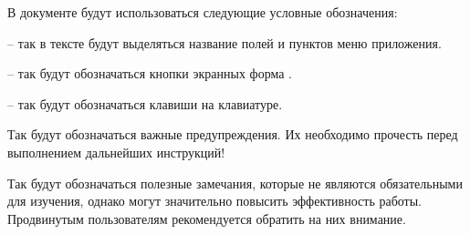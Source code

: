  В документе будут использоваться следующие условные обозначения:  \vspace*{0.5em}
 
  -- так в тексте будут выделяться название полей и пунктов меню приложения.
 
  -- так будут обозначаться кнопки экранных форма \tmis.
 
  -- так будут обозначаться клавиши на клавиатуре.
 
 \begin{vnim}
  Так будут обозначаться важные предупреждения. Их необходимо прочесть перед выполнением дальнейших инструкций!
 \end{vnim}
 
 \begin{prim}
 Так будут обозначаться полезные замечания, которые не являются обязательными для изучения, однако могут значительно повысить эффективность работы. Продвинутым пользователям рекомендуется обратить на них внимание.
 \end{prim}
